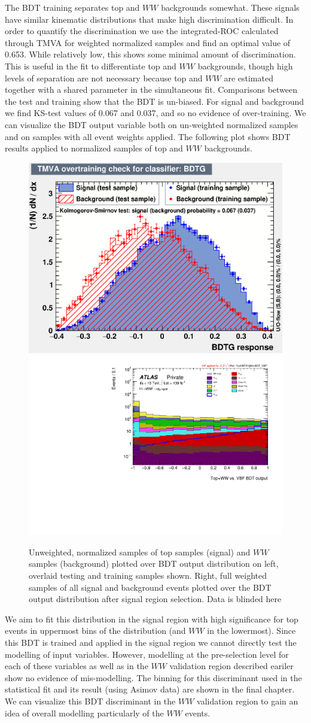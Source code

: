 The BDT training separates top and $WW$ backgrounds somewhat. These signals have similar kinematic distributions that make high discrimination difficult. In order to quantify the discrimination we use the integrated-ROC calculated through TMVA for weighted normalized samples and find an optimal value of 0.653. While relatively low, this shows some minimal amount of discrimination. This is useful in the fit to differentiate top and $WW$ backgrounds, though high levels of separation are not necessary because top and $WW$ are estimated together with a shared parameter in the simultaneous fit. Comparisons between the test and training show that the BDT is un-biased. For signal and background we find KS-test values of 0.067 and 0.037, and so no evidence of over-training. We can visualize the BDT output variable both on un-weighted normalized samples and on samples with all event weights applied. The following plot shows BDT results applied to normalized samples of top and $WW$ backgrounds.

\begin{figure}[!htbp]
\centering
  \includegraphics[width=.45\linewidth]{Pictures/TopvsWW/overtrain_BDTG.eps}
  \includegraphics[width=.35\linewidth]{Pictures/run2-emme-CutVBFDYjjMin-BDT_VBF-log.pdf}
\caption{Unweighted, normalized samples of top samples (signal) and $WW$ samples (background) plotted over BDT output distribution on left, overlaid testing and training samples shown. Right, full weighted samples of all signal and background events plotted over the BDT output distribution after signal region selection. Data is blinded here}
\label{fig:WWBDTresult}
\end{figure}

We aim to fit this distribution in the signal region with high significance for top events in uppermost bins of the distribution (and $WW$ in the lowermost). Since this BDT is trained and applied in the signal region we cannot directly test the modelling of input variables. However, modelling at the pre-selection level for each of these variables as well as in the $WW$ validation region described eariler show no evidence of mis-modelling. The binning for this discriminant used in the statistical fit and its result (using Asimov data) are shown in the final chapter. We can visualize this BDT discriminant in the $WW$ validation region to gain an idea of overall modelling particularly of the $WW$ events.

